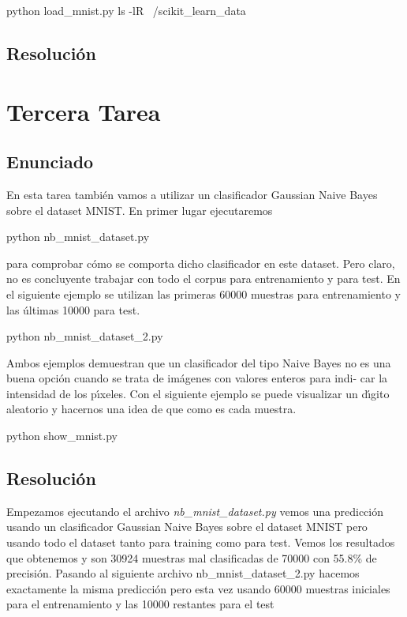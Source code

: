 \documentclass[12pt,twoside]{article}
\begin{document}
\begin{center}
python load_mnist.py
ls -lR ~/scikit_learn_data
\end{center}
\begin{enumerate}[(a)]


\subsection{Resolución}



\section{Tercera Tarea}

\subsection{Enunciado}

\noindent
En esta tarea también vamos a utilizar un clasificador Gaussian Naive
Bayes sobre el dataset MNIST. En primer lugar ejecutaremos
\begin{center}
python nb_mnist_dataset.py
\end{center}
para comprobar cómo se comporta dicho clasificador en este dataset. Pero
claro, no es concluyente trabajar con todo el corpus para entrenamiento y
para test. En el siguiente ejemplo se utilizan las primeras 60000 muestras
para entrenamiento y las últimas 10000 para test.
\begin{center}
python nb_mnist_dataset_2.py
\end{center}
Ambos ejemplos demuestran que un clasificador del tipo Naive Bayes no es
una buena opción cuando se trata de imágenes con valores enteros para indi-
car la intensidad de los pı́xeles. Con el siguiente ejemplo se puede visualizar
un dı́gito aleatorio y hacernos una idea de que como es cada muestra.
\begin{center}
python show_mnist.py
\end{center}

\subsection{Resolución}


Empezamos ejecutando el archivo \textit{nb_mnist_dataset.py} vemos una predicción usando un clasificador Gaussian Naive Bayes sobre el dataset MNIST pero usando todo el dataset tanto para training como para test. Vemos los resultados que obtenemos y son 30924 muestras mal clasificadas de 70000 con 55.8\% de precisión.
Pasando al siguiente archivo nb_mnist_dataset_2.py hacemos exactamente la misma predicción pero esta vez usando 60000 muestras iniciales para el entrenamiento y las 10000 restantes para el test


\end{enumerate}
\end{document}
